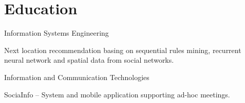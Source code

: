 \documentclass[]{deedy-resume-openfont}
\begin{document}
%
%
\lastupdated

%
%



%
%

\begin{minipage}[t]{0.33\textwidth} 


\section{Education} 

\sectionsep

Information Systems Engineering

 Next location recommendation basing on sequential rules mining, recurrent neural network and spatial data from social networks.
\sectionsep

Information and Communication Technologies

 SociaInfo – System and mobile application supporting ad-hoc meetings.
\sectionsep



\end{minipage}
\end{document}
